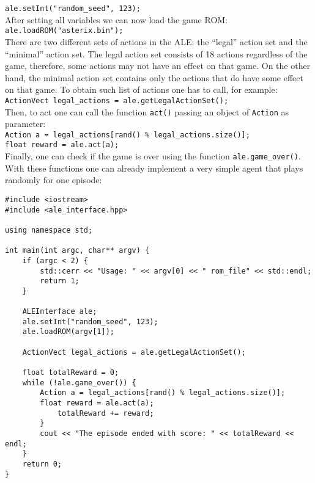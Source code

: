 \documentclass[12pt]{article}
\begin{document}
\verb+ale.setInt("random_seed", 123);+\\

After setting all variables we can now load the game ROM:\\

\verb+ale.loadROM("asterix.bin");+\\

There are two different sets of actions in the ALE: the ``legal'' action set and the ``minimal'' 
action set. The legal action set consists of 18 actions regardless of the game, therefore, some 
actions may not have an effect on that game. On the other hand, the minimal action set contains only 
the actions that do have some effect on that game. To obtain such list of actions one has to call, for
example:\\

\verb+ActionVect legal_actions = ale.getLegalActionSet();+\\

Then, to act one can call the function \verb+act()+ passing an object of \verb+Action+ as parameter:\\

\verb+Action a = legal_actions[rand() % legal_actions.size()];+\\
\indent \verb+float reward = ale.act(a);+\\

Finally, one can check if the game is over using the function \verb+ale.game_over()+. With these 
functions one can already implement a very simple agent that plays randomly for one episode:

\begin{verbatim}
#include <iostream>
#include <ale_interface.hpp>

using namespace std;

int main(int argc, char** argv) {
    if (argc < 2) {
        std::cerr << "Usage: " << argv[0] << " rom_file" << std::endl;
        return 1;
    }

    ALEInterface ale;
    ale.setInt("random_seed", 123);
    ale.loadROM(argv[1]);

    ActionVect legal_actions = ale.getLegalActionSet();
    
    float totalReward = 0;
    while (!ale.game_over()) {
        Action a = legal_actions[rand() % legal_actions.size()];    
        float reward = ale.act(a);
            totalReward += reward;
        }
        cout << "The episode ended with score: " << totalReward << endl;
    }
    return 0;
}
\end{verbatim}
\end{document}
